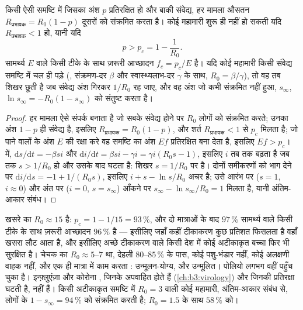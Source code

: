 \begin{theorem}[सामूहिक प्रतिरक्षा की देहली]\label{thm:b3:adaptive-immunity:herd}
किसी ऐसी समष्टि में जिसका अंश $p$ प्रतिरक्षित हो और बाकी संवेद्य, हर
मामला औसतन $R_{\text{प्रभावक}} = R_{0}(1 -
p)$ दूसरों को संक्रमित करता है। कोई महामारी शुरू ही नहीं हो सकती यदि
$R_{\text{प्रभावक}} < 1$ हो, यानी यदि
\[
p > p_{c} = 1 - \frac{1}{R_{0}} .
\]
सामर्थ्य $E$ वाले किसी टीके के साथ ज़रूरी आच्छादन $f_{c} = p_{c}/E$ है।
यदि कोई महामारी किसी संवेद्य समष्टि में चल ही पड़े (,
संक्रमण-दर $\beta$ और स्वास्थ्यलाभ-दर $\gamma$ के साथ, $R_{0} =
\beta/\gamma$), तो वह तब शिखर छूती है जब संवेद्य अंश गिरकर
$1/R_{0}$ रह जाए, और वह अंश जो कभी संक्रमित नहीं हुआ, $s_{\infty}$,
$\ln s_{\infty} = -R_{0}(1 - s_{\infty})$ को संतुष्ट करता है।
\end{theorem}
\begin{proof}
हर मामला ऐसे संपर्क बनाता है जो सबके संवेद्य होने पर $R_{0}$ लोगों को
संक्रमित करते; उनका अंश $1 - p$ ही संवेद्य है, इसलिए $R_{\text{प्रभावक}} =
R_{0}(1-p)$, और शर्त $R_{\text{प्रभावक}} < 1$ से $p_{c}$ मिलता है; जो 
पाने वालों के अंश $E$ की रक्षा करे वह समष्टि का अंश $Ef$ प्रतिरक्षित
बना देता है, इसलिए $Ef > p_{c}$।  में,
$\mathrm{d}s/\mathrm{d}t = -\beta si$ और $\mathrm{d}i/\mathrm{d}t =
\beta si - \gamma i = \gamma i(R_{0}s - 1)$, इसलिए $i$ तब तक बढ़ता है जब तक $s >
1/R_{0}$ हो और उसके बाद घटता है: शिखर $s = 1/R_{0}$ पर है। दोनों
समीकरणों को भाग देने पर $\mathrm{d}i/\mathrm{d}s = -1 + 1/(R_{0}s)$,
इसलिए $i + s -
\ln s/R_{0}$ अचर है; उसे आरंभ पर ($s = 1$, $i
\approx 0$) और अंत पर ($i = 0$, $s = s_{\infty}$) आँकने पर
$s_{\infty} - \ln s_{\infty}/R_{0} = 1$ मिलता है, यानी अंतिम-आकार संबंध।
\end{proof}

\begin{example}[खसरा और चेचक]\label{ex:b3:adaptive-immunity:measles}
खसरे का $R_{0} \approx 15$ है: $p_{c} = 1 - 1/15 = 93\,\%$, और दो
मात्राओं के बाद $97\,\%$ सामर्थ्य वाले किसी टीके के साथ ज़रूरी आच्छादन
$96\,\%$ है --- इसीलिए जहाँ कहीं टीकाकरण कुछ प्रतिशत फिसलता है वहाँ
खसरा लौट आता है, और इसीलिए अच्छे टीकाकरण वाले किसी देश में कोई अटीकाकृत
बच्चा फिर भी सुरक्षित है। चेचक का $R_{0} \approx 5$--$7$ था, देहली
$80$--$85\,\%$ के पास, कोई पशु-भंडार नहीं, कोई अलक्षणी वाहक नहीं, और
एक ही मात्रा में काम करता : उन्मूलन-योग्य, और उन्मूलित। पोलियो
लगभग वहीं पहुँच चुका है। इन्फ़्लुएंज़ा और कोरोना , जिनके 
अपवाहित होते हैं (\cref{ch:b3:virology}) और जिनकी प्रतिरक्षा घटती है,
नहीं हैं। किसी अटीकाकृत समष्टि में $R_{0} = 3$ वाली कोई महामारी,
अंतिम-आकार संबंध से, लोगों के $1 - s_{\infty} = 94\,\%$ को संक्रमित
करती है; $R_{0} = 1.5$ के साथ $58\,\%$ को।
\end{example}


